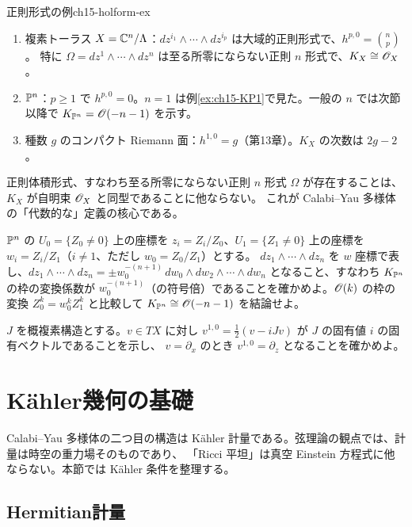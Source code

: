 \begin{myex}{正則形式の例}{ch15-holform-ex}
\begin{enumerate}
\item 複素トーラス $X=\mathbb{C}^n/\Lambda$：$dz^{i_1}\wedge\cdots\wedge dz^{i_p}$ は大域的正則形式で、$h^{p,0} = \binom{n}{p}$。
特に $\Omega = dz^1\wedge\cdots\wedge dz^n$ は至る所零にならない正則 $n$ 形式で、$K_X\cong\mathscr{O}_X$。
\item $\mathbb{P}^n$：$p\geq 1$ で $h^{p,0}=0$。$n=1$ は例\ref{ex:ch15-KP1}で見た。一般の $n$ では次節以降で $K_{\mathbb{P}^n}=\mathscr{O}(-n-1)$ を示す。
\item 種数 $g$ のコンパクト Riemann 面：$h^{1,0} = g$（第13章）。$K_X$ の次数は $2g-2$。
\end{enumerate}
\end{myex}

正則体積形式、すなわち至る所零にならない正則 $n$ 形式 $\Omega$ が存在することは、$K_X$ が自明束 $\mathscr{O}_X$ と同型であることに他ならない。
これが Calabi--Yau 多様体の「代数的な」定義の核心である。

$\mathbb{P}^n$ の $U_0=\{Z_0\neq0\}$ 上の座標を $z_i = Z_i/Z_0$、$U_1 = \{Z_1\neq 0\}$ 上の座標を $w_i = Z_i/Z_1$（$i\neq1$、ただし $w_0 = Z_0/Z_1$）とする。
$dz_1\wedge\cdots\wedge dz_n$ を $w$ 座標で表し、$dz_1\wedge\cdots\wedge dz_n = \pm w_0^{-(n+1)}\,dw_0\wedge dw_2\wedge\cdots\wedge dw_n$ となること、すなわち $K_{\mathbb{P}^n}$ の枠の変換係数が $w_0^{-(n+1)}$（の符号倍）であることを確かめよ。$\mathscr{O}(k)$ の枠の変換 $Z_0^k = w_0^kZ_1^k$ と比較して
$K_{\mathbb{P}^n}\cong\mathscr{O}(-n-1)$ を結論せよ。

$J$ を概複素構造とする。$v\in TX$ に対し $v^{1,0} = \frac12(v - iJv)$ が $J$ の固有値 $i$ の固有ベクトルであることを示し、
$v = \partial_{x}$ のとき $v^{1,0} = \partial_z$ となることを確かめよ。

\section{K\"ahler幾何の基礎}

Calabi--Yau 多様体の二つ目の構造は K\"ahler 計量である。弦理論の観点では、計量は時空の重力場そのものであり、
「Ricci 平坦」は真空 Einstein 方程式に他ならない。本節では K\"ahler 条件を整理する。

\subsection{Hermitian計量}

